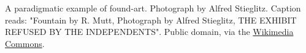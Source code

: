 A paradigmatic example of found-art. Photograph by Alfred Stieglitz. Caption reads: "Fountain by R. Mutt, Photograph by Alfred Stieglitz, THE EXHIBIT REFUSED BY THE INDEPENDENTS". Public domain, via the \href{https://commons.wikimedia.org/w/index.php?title=File:Duchamp_Fountaine.jpg&oldid=133561865}{Wikimedia Commons}.
    